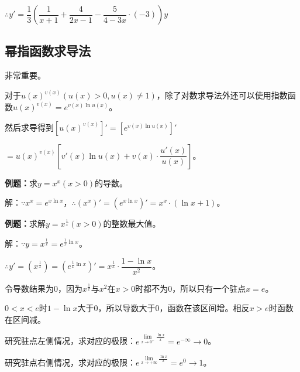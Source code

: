 \documentclass[UTF8, 12pt]{ctexart}
\begin{document}
$\therefore y'=\dfrac{1}{3}\left(\dfrac{1}{x+1}+\dfrac{4}{2x-1}-\dfrac{5}{4-3x}\cdot(-3)\right)y$

\subsection{幂指函数求导法}

非常重要。

对于$u(x)^{v(x)}(u(x)>0,u(x)\neq 1)$，除了对数求导法外还可以使用指数函数$u(x)^{v(x)}=e^{v(x)\ln u(x)}$。

然后求导得到$[u(x)^{v(x)}]'=[e^{v(x)\ln u(x)}]'$

$=u(x)^{v(x)}\left[v'(x)\ln u(x)+v(x)\cdot\dfrac{u'(x)}{u(x)}\right]$。

\textbf{例题：}求$y=x^x(x>0)$的导数。

解：$\because x^x=e^{x\ln x}$，$\therefore (x^x)'=(e^{x\ln x})'=x^x\cdot(\ln x+1)$。

\textbf{例题：}求解$y=x^{\frac{1}{x}}(x>0)$的整数最大值。

解：$\because y=x^{\frac{1}{x}}=e^{\frac{1}{x}\ln x}$。

$\therefore y'=\left(x^{\frac{1}{x}}\right)=\left(e^{\frac{1}{x}\ln x}\right)'=x^{\frac{1}{x}}\cdot\dfrac{1-\ln x}{x^2}$。

令导数结果为0，因为$x^{\frac{1}{x}}$与$x^2$在$x>0$时都不为0，所以只有一个驻点$x=e$。

$0<x<e$时$1-\ln x$大于0，所以导数大于0，函数在该区间增。相反$x>e$时函数在区间减。

研究驻点左侧情况，求对应的极限：$e^{\lim\limits_{x\to 0^+}\frac{\ln x}{x}}=e^{-\infty}\to 0$。

研究驻点右侧情况，求对应的极限：$e^{\lim\limits_{x\to+\infty}\frac{\ln x}{x}}=e^0\to 1$。

\end{document}
